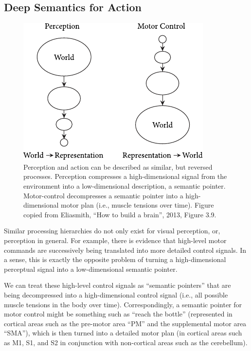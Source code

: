 \documentclass[10pt,letterpaper,oneside]{article}
\begin{document}
\subsection{Deep Semantics for Action}

\begin{figure}
	\centering
	\includegraphics{media/htbab_perceptual_motor.pdf}
	\caption{Perception and action can be described as similar, but reversed processes. Perception compresses a high-dimensional signal from the environment into a low-dimensional description, a semantic pointer. Motor-control decompresses a semantic pointer into a high-dimensional motor plan (i.e., muscle tensions over time). Figure copied from Eliasmith, \enquote{How to build a brain}, 2013, Figure 3.9.}
\end{figure}

Similar processing hierarchies do not only exist for visual perception, or, perception in general. For example, there is evidence that high-level motor commands are successively being translated into more detailed control signals. In a sense, this is exactly the opposite problem of turning a high-dimensional perceptual signal into a low-dimensional semantic pointer. 

We can treat these high-level control signals as \enquote{semantic pointers} that are being decompressed into a high-dimensional control signal (i.e., all possible muscle tensions in the body over time). Correspondingly, a semantic pointer for motor control might be something such as \enquote{reach the bottle} (represented in cortical areas such as the pre-motor area \enquote{PM} and the supplemental motor area \enquote{SMA}), which is then turned into a detailed motor plan (in cortical areas such as M1, S1, and S2 in conjunction with non-cortical areas such as the cerebellum).
\end{document}
